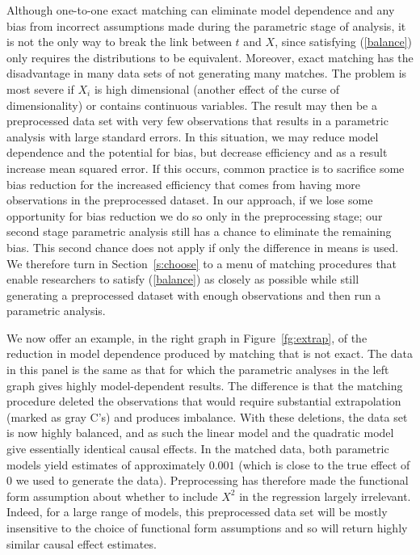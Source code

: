 \documentclass[11pt,titlepage]{article}
\begin{document}
Although one-to-one exact matching can eliminate model dependence and
any bias from incorrect assumptions made during the parametric stage
of analysis, it is not the only way to break the link between $t$ and
$X$, since satisfying (\ref{balance}) only requires the distributions
to be equivalent.  Moreover, exact matching has the disadvantage in
many data sets of not generating many matches.  The problem is most
severe if $X_i$ is high dimensional (another effect of the curse of
dimensionality) or contains continuous variables.  The result may then
be a preprocessed data set with very few observations that results in
a parametric analysis with large standard errors.  In this situation,
we may reduce model dependence and the potential for bias, but
decrease efficiency and as a result increase mean squared error.  If
this occurs, common practice is to sacrifice some bias reduction for
the increased efficiency that comes from having more observations in
the preprocessed dataset.  In our approach, if we lose some
opportunity for bias reduction we do so only in the preprocessing
stage; our second stage parametric analysis still has a chance to
eliminate the remaining bias.  This second chance does not apply if
only the difference in means is used.  We therefore turn in
Section~\ref{s:choose} to a menu of matching procedures that enable
researchers to satisfy (\ref{balance}) as closely as possible while
still generating a preprocessed dataset with enough observations and
then run a parametric analysis.

We now offer an example, in the right graph in Figure~\ref{fg:extrap},
of the reduction in model dependence produced by matching that is not
exact.  The data in this panel is the same as that for which the
parametric analyses in the left graph gives highly model-dependent
results.  The difference is that the matching procedure deleted the
observations that would require substantial extrapolation (marked as
gray C's) and produces imbalance.  With these deletions, the data set
is now highly balanced, and as such the linear model and the quadratic
model give essentially identical causal effects.  In the matched data,
both parametric models yield estimates of approximately $0.001$ (which
is close to the true effect of $0$ we used to generate the data).
Preprocessing has therefore made the functional form assumption about
whether to include $X^2$ in the regression largely irrelevant.
Indeed, for a large range of models, this preprocessed data set will
be mostly insensitive to the choice of functional form assumptions and
so will return highly similar causal effect estimates.
\end{document}
